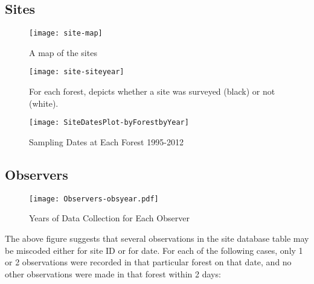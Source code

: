 \subsection{Sites}






\begin{figure}
\texttt{[image: site-map]}
\caption{A map of the sites}
\label{fig:site-map}
\end{figure}


\begin{figure}
\texttt{[image: site-siteyear]}
\caption{For each forest, depicts whether a site was surveyed (black) or not (white).}
\label{fig:site-siteyear}
\end{figure}


\begin{figure}
\texttt{[image: SiteDatesPlot-byForestbyYear]}
\caption{Sampling Dates at Each Forest 1995-2012}
\label{fig:SiteDatesPlot-byForestbyYear}
\end{figure}



\subsection{Observers}

\begin{figure}
\texttt{[image: Observers-obsyear.pdf]}
\caption{Years of Data Collection for Each Observer}
\label{fig:Observers-obsyear}
\end{figure}

The above figure suggests that several observations in the site database table may be miscoded either for site ID or for date.  For each of the following cases, only 1 or 2 observations were recorded in that particular forest on that date, and no other observations were made in that forest within 2 days:

